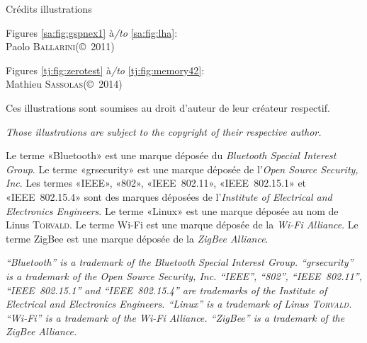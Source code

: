 \pagestyle{empty}
\cleardoublepage

\setlength{\oddsidemargin}{79pt}
\setlength{\marginparsep}{0pt}
\setlength{\marginparwidth}{0pt}
\setlength{\marginparpush}{0pt}
\setlength{\hsize}{\paperwidth}
\addtolength{\hsize}{-\oddsidemargin}
\addtolength{\hsize}{-\oddsidemargin}
\addtolength{\hsize}{-2in}

\begin{center}
\begin{minipage}{.6\textwidth}
\centering
{\Large Crédits illustrations}

\vspace{1.5cm}
Figures \ref{sa:fig:gspnex1} à\textit{/to} \ref{sa:fig:lha}:\\
Paolo \textsc{Ballarini}\quad(©~2011)
\medskip

Figures \ref{tj:fig:zerotest} à\textit{/to} \ref{tj:fig:memory42}:\\
Mathieu \textsc{Sassolas}\quad(©~2014)

\bigskip
Ces illustrations sont soumises au droit d'auteur de leur créateur respectif.

\medskip
\textit{Those illustrations are subject to the copyright of their respective author.}
\end{minipage}
\end{center}

\vfill

\begin{small}
Le terme «Bluetooth» est une marque déposée du \textit{Bluetooth Special Interest Group}.
Le terme «grsecurity» est une marque déposée de l'\textit{Open Source Security, Inc}.
Les termes «IEEE», «802», «IEEE~802.11», «IEEE~802.15.1» et «IEEE~802.15.4» sont des marques déposées de l'\textit{Institute of Electrical and Electronics Engineers}.
Le terme «Linux» est une marque déposée au nom de Linus \textsc{Torvald}.
Le terme Wi-Fi est une marque déposée de la \textit{Wi-Fi Alliance}.
Le terme ZigBee est une marque déposée de la \textit{ZigBee Alliance}.
\medskip

{\it
“Bluetooth” is a trademark of the Bluetooth Special Interest Group.
“grsecurity” is a trademark of the Open Source Security, Inc.
“IEEE”, “802”, “IEEE~802.11”, “IEEE~802.15.1” and “IEEE~802.15.4” are trademarks of the Institute of Electrical and Electronics Engineers.
“Linux” is a trademark of Linus \textsc{Torvald}.
“Wi-Fi” is a trademark of the Wi-Fi Alliance.
“ZigBee” is a trademark of the ZigBee Alliance.
}
\end{small}

